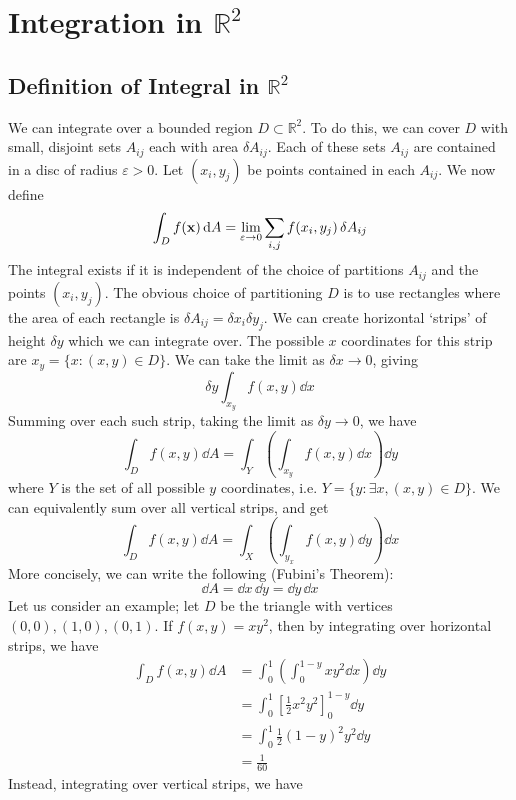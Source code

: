 \documentclass{article}
\begin{document}
\section{Integration in $\mathbb R^2$}
\subsection{Definition of Integral in $\mathbb R^2$}
We can integrate over a bounded region $D \subset \mathbb R^2$. To do this, we can cover $D$ with small, disjoint sets $A_{ij}$ each with area $\delta A_{ij}$. Each of these sets $A_{ij}$ are contained in a disc of radius $\varepsilon > 0$. Let $(x_i, y_j)$ be points contained in each $A_{ij}$. We now define
\[ \int_D f(\vb x) \dd{A} = \lim_{\varepsilon \to 0} \sum_{i, j} f(x_i, y_j) \,\delta A_{ij} \]
The integral exists if it is independent of the choice of partitions $A_{ij}$ and the points $(x_i, y_j)$. The obvious choice of partitioning $D$ is to use rectangles where the area of each rectangle is $\delta A_{ij} = \delta x_i \delta y_j$. We can create horizontal `strips' of height $\delta y$ which we can integrate over. The possible $x$ coordinates for this strip are $x_y = \{ x \colon (x, y) \in D \}$. We can take the limit as $\delta x \to 0$, giving
\[ \delta y \int_{x_y} f(x, y) \dd{x} \]
Summing over each such strip, taking the limit as $\delta y \to 0$, we have
\[ \int_D f(x, y) \dd{A} = \int_Y \left( \int_{x_y} f(x, y) \dd{x} \right) \dd{y} \]
where $Y$ is the set of all possible $y$ coordinates, i.e. $Y = \{ y \colon \exists x, (x, y) \in D \}$. We can equivalently sum over all vertical strips, and get
\[ \int_D f(x, y) \dd{A} = \int_X \left( \int_{y_x} f(x, y) \dd{y} \right) \dd{x} \]
More concisely, we can write the following (Fubini's Theorem):
\[ \dd{A} = \dd{x} \, \dd{y} = \dd{y} \, \dd{x} \]
Let us consider an example; let $D$ be the triangle with vertices $(0, 0), (1, 0), (0, 1)$. If $f(x, y) = xy^2$, then by integrating over horizontal strips, we have
\begin{align*}
    \int_D f(x, y) \dd{A} & = \int_0^1 \left( \int_0^{1-y} xy^2 \dd{x} \right) \dd{y}  \\
                          & = \int_0^1 \left[ \frac{1}{2}x^2y^2 \right]_0^{1-y} \dd{y} \\
                          & = \int_0^1 \frac{1}{2}(1-y)^2y^2 \dd{y}                    \\
                          & = \frac{1}{60}
\end{align*}
Instead, integrating over vertical strips, we have
\end{document}
